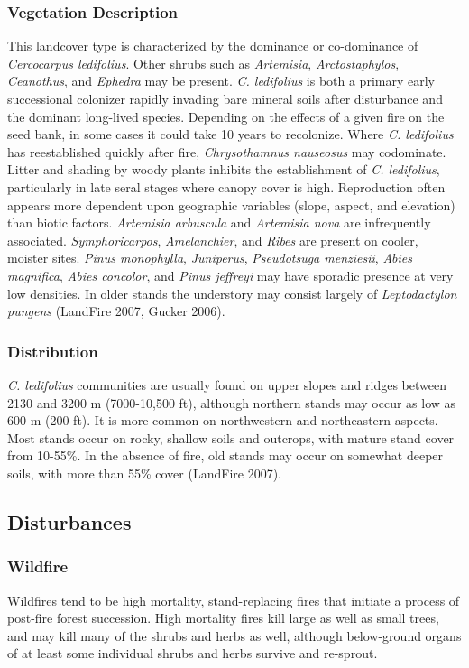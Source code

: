 \subsubsection{Vegetation Description}
This landcover type is characterized by the dominance or co-dominance of \emph{Cercocarpus ledifolius}. Other shrubs such as \emph{Artemisia}, \emph{Arctostaphylos}, \emph{Ceanothus}, and \emph{Ephedra} may be present. \emph{C. ledifolius} is both a primary early successional colonizer rapidly invading bare mineral soils after disturbance and the dominant long-lived species. Depending on the effects of a given fire on the seed bank, in some cases it could take 10 years to recolonize. Where \emph{C. ledifolius} has reestablished quickly after fire, \emph{Chrysothamnus nauseosus} may codominate. Litter and shading by woody plants inhibits the establishment of \emph{C. ledifolius}, particularly in late seral stages where canopy cover is high. Reproduction often appears more dependent upon geographic variables (slope, aspect, and elevation) than biotic factors. \emph{Artemisia arbuscula} and \emph{Artemisia nova} are infrequently associated. \emph{Symphoricarpos}, \emph{Amelanchier}, and \emph{Ribes} are present on cooler, moister sites. \emph{Pinus monophylla}, \emph{Juniperus}, \emph{Pseudotsuga menziesii}, \emph{Abies magnifica}, \emph{Abies concolor}, and \emph{Pinus jeffreyi} may have sporadic presence at very low densities. In older stands the understory may consist largely of \emph{Leptodactylon pungens} (LandFire 2007, Gucker 2006).

\subsubsection{Distribution}
\emph{C. ledifolius} communities are usually found on upper slopes and ridges between 2130 and 3200 m (7000-10,500 ft), although northern stands may occur as low as 600 m (200 ft). It is more common on northwestern and northeastern aspects. Most stands occur on rocky, shallow soils and outcrops, with mature stand cover from 10-55\%. In the absence of fire, old stands may occur on somewhat deeper soils, with more than 55\% cover (LandFire 2007).

\subsection*{Disturbances}

\subsubsection{Wildfire}
Wildfires tend to be high mortality, stand-replacing fires that initiate a process of post-fire forest succession. High mortality fires kill large as well as small trees, and may kill many of the shrubs and herbs as well, although below-ground organs of at least some individual shrubs and herbs survive and re-sprout. 

